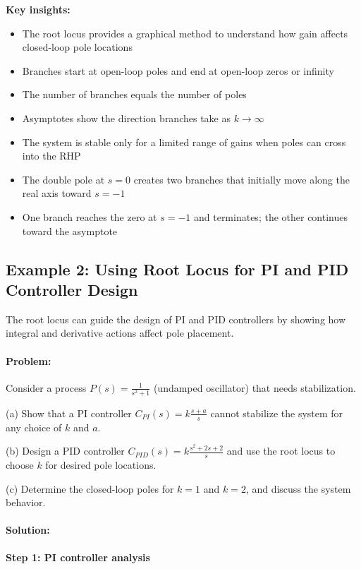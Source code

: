 \documentclass[11pt,a4paper]{article}
\begin{document}
\textbf{Key insights:}
\begin{itemize}
  \item The root locus provides a graphical method to understand how gain affects closed-loop pole locations
  \item Branches start at open-loop poles and end at open-loop zeros or infinity
  \item The number of branches equals the number of poles
  \item Asymptotes show the direction branches take as $k \to \infty$
  \item The system is stable only for a limited range of gains when poles can cross into the RHP
  \item The double pole at $s = 0$ creates two branches that initially move along the real axis toward $s = -1$
  \item One branch reaches the zero at $s = -1$ and terminates; the other continues toward the asymptote
\end{itemize}

\subsection{Example 2: Using Root Locus for PI and PID Controller Design}

The root locus can guide the design of PI and PID controllers by showing how integral and derivative actions affect pole placement.

\paragraph{Problem:}
Consider a process $P(s) = \frac{1}{s^2 + 1}$ (undamped oscillator) that needs stabilization.

(a) Show that a PI controller $C_{PI}(s) = k\frac{s+a}{s}$ cannot stabilize the system for any choice of $k$ and $a$.

(b) Design a PID controller $C_{PID}(s) = k\frac{s^2 + 2s + 2}{s}$ and use the root locus to choose $k$ for desired pole locations.

(c) Determine the closed-loop poles for $k = 1$ and $k = 2$, and discuss the system behavior.

\paragraph{Solution:}

\textbf{Step 1: PI controller analysis}
\end{document}
